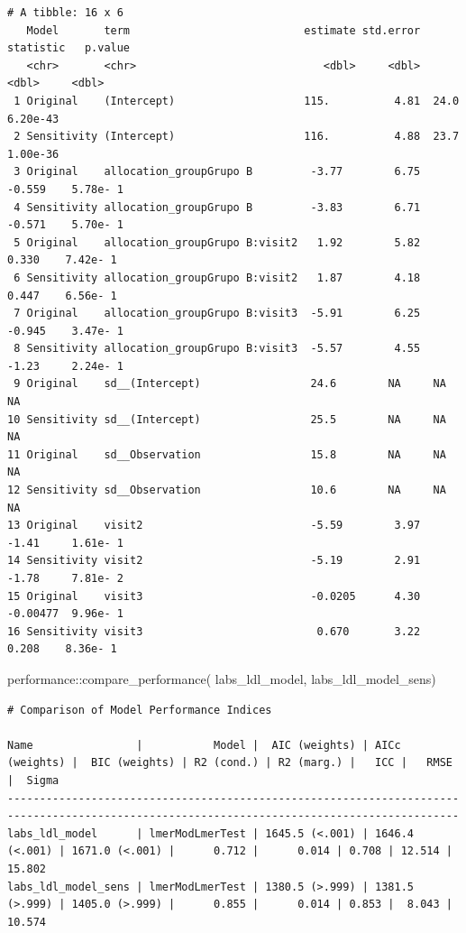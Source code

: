 \documentclass[
  12pt,
]{article}
\newenvironment{Shaded}{\begin{snugshade}}{\end{snugshade}}
\newcommand{\FunctionTok}[1]{\textcolor[rgb]{0.28,0.35,0.67}{#1}}
\newcommand{\NormalTok}[1]{\textcolor[rgb]{0.00,0.23,0.31}{#1}}
\newcommand{\SpecialCharTok}[1]{\textcolor[rgb]{0.37,0.37,0.37}{#1}}
\begin{document}
\begin{verbatim}
# A tibble: 16 x 6
   Model       term                           estimate std.error statistic   p.value
   <chr>       <chr>                             <dbl>     <dbl>     <dbl>     <dbl>
 1 Original    (Intercept)                    115.          4.81  24.0      6.20e-43
 2 Sensitivity (Intercept)                    116.          4.88  23.7      1.00e-36
 3 Original    allocation_groupGrupo B         -3.77        6.75  -0.559    5.78e- 1
 4 Sensitivity allocation_groupGrupo B         -3.83        6.71  -0.571    5.70e- 1
 5 Original    allocation_groupGrupo B:visit2   1.92        5.82   0.330    7.42e- 1
 6 Sensitivity allocation_groupGrupo B:visit2   1.87        4.18   0.447    6.56e- 1
 7 Original    allocation_groupGrupo B:visit3  -5.91        6.25  -0.945    3.47e- 1
 8 Sensitivity allocation_groupGrupo B:visit3  -5.57        4.55  -1.23     2.24e- 1
 9 Original    sd__(Intercept)                 24.6        NA     NA       NA       
10 Sensitivity sd__(Intercept)                 25.5        NA     NA       NA       
11 Original    sd__Observation                 15.8        NA     NA       NA       
12 Sensitivity sd__Observation                 10.6        NA     NA       NA       
13 Original    visit2                          -5.59        3.97  -1.41     1.61e- 1
14 Sensitivity visit2                          -5.19        2.91  -1.78     7.81e- 2
15 Original    visit3                          -0.0205      4.30  -0.00477  9.96e- 1
16 Sensitivity visit3                           0.670       3.22   0.208    8.36e- 1
\end{verbatim}

\begin{Shaded}
\begin{Highlighting}[]
\NormalTok{performance}\SpecialCharTok{::}\FunctionTok{compare\_performance}\NormalTok{(}
\NormalTok{    labs\_ldl\_model, }
\NormalTok{    labs\_ldl\_model\_sens) }
\end{Highlighting}
\end{Shaded}

\begin{verbatim}
# Comparison of Model Performance Indices

Name                |           Model |  AIC (weights) | AICc (weights) |  BIC (weights) | R2 (cond.) | R2 (marg.) |   ICC |   RMSE |  Sigma
--------------------------------------------------------------------------------------------------------------------------------------------
labs_ldl_model      | lmerModLmerTest | 1645.5 (<.001) | 1646.4 (<.001) | 1671.0 (<.001) |      0.712 |      0.014 | 0.708 | 12.514 | 15.802
labs_ldl_model_sens | lmerModLmerTest | 1380.5 (>.999) | 1381.5 (>.999) | 1405.0 (>.999) |      0.855 |      0.014 | 0.853 |  8.043 | 10.574
\end{verbatim}
\end{document}
